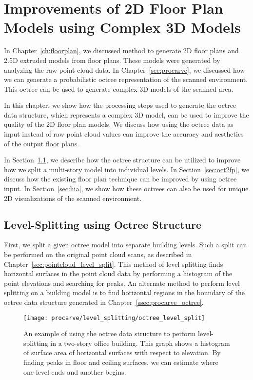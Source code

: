 \documentclass[12pt,onecolumn,oneside]{book}
\begin{document}
\chapter{Improvements of 2D Floor Plan Models using Complex 3D Models}
\label{ch:better_floorplans}

In Chapter~\ref{ch:floorplan}, we discussed method to generate 2D floor plans and 2.5D extruded models from floor plans.  These models were generated by analyzing the raw point-cloud data.  In Chapter~\ref{sec:procarve}, we discussed how we can generate a probabilistic octree representation of the scanned environment.  This octree can be used to generate complex 3D models of the scanned area.

In this chapter, we show how the processing steps used to generate the octree data structure, which represents a complex 3D model, can be used to improve the quality of the 2D floor plan models.  We discuss how using the octree data as input instead of raw point cloud values can improve the accuracy and aesthetics of the output floor plans.

In Section~\ref{sec:octree_level_split}, we describe how the octree structure can be utilized to improve how we split a multi-story model into individual levels.  In Section~\ref{sec:oct2fp}, we discuss how the existing floor plan technique can be improved by using octree input.  In Section~\ref{sec:hia}, we show how these octrees can also be used for unique 2D visualizations of the scanned environment.

\section{Level-Splitting using Octree Structure}
\label{sec:octree_level_split}

First, we split a given octree model into separate building levels.  Such a split can be performed on the original point cloud scans, as described in Chapter~\ref{sec:pointcloud_level_split}.  This method of level splitting finds horizontal surfaces in the point cloud data by performing a histogram of the point elevations and searching for peaks.  An alternate method to perform level splitting on a building model is to find horizontal regions in the boundary of the octree data structure generated in Chapter~\ref{ssec:procarve_octree}.  

\begin{figure}
	\centerline{\texttt{[image: procarve/level\_splitting/octree\_level\_split]}}

	\caption[Using octree to find levels of two-story dataset.]{An example of using the octree data structure to perform level-splitting in a two-story office building.  This graph shows a histogram of surface area of horizontal surfaces with respect to elevation.  By finding peaks in floor and ceiling surfaces, we can estimate where one level ends and another begins.}
	\label{fig:octree_level_split}
\end{figure}
\end{document}

